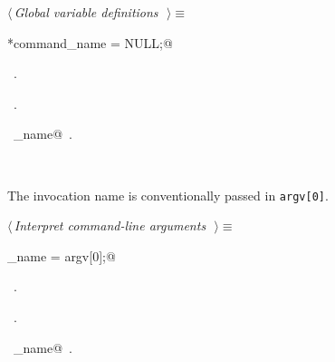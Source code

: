 \documentclass{report}
\begin{document}
\begin{flushleft} \small
\begin{minipage}{\linewidth} \label{scrap21}
$\langle\,${\it Global variable definitions}\nobreak\ {\footnotesize {}}$\,\rangle\equiv$
\vspace{-1ex}
\begin{list}{}{} \item
\mbox{}\verb@char *command_name = NULL;@\\
\mbox{}\verb@@{\NWsep}
\end{list}
\vspace{-1ex}
\footnotesize\addtolength{\baselineskip}{-1ex}
\begin{list}{}{\setlength{\itemsep}{-\parsep}\setlength{\itemindent}{-\leftmargin}}
\item \NWtxtMacroDefBy\ .
\item \NWtxtMacroRefIn\ .
\end{list}
\vspace{-2ex}
\footnotesize\addtolength{\baselineskip}{-1ex}
\begin{list}{}{\setlength{\itemsep}{-\parsep}\setlength{\itemindent}{-\leftmargin}}
\item \NWtxtIdentsUsed\nobreak\  \verb@command_name@\nobreak\ .\end{list}
\end{minipage}\\[4ex]
\end{flushleft}
The invocation name is conventionally passed in \verb|argv[0]|.
\begin{flushleft} \small
\begin{minipage}{\linewidth} \label{scrap22}
$\langle\,${\it Interpret command-line arguments}\nobreak\ {\footnotesize {}}$\,\rangle\equiv$
\vspace{-1ex}
\begin{list}{}{} \item
\mbox{}\verb@command_name = argv[0];@\\
\mbox{}\verb@@{\NWsep}
\end{list}
\vspace{-1ex}
\footnotesize\addtolength{\baselineskip}{-1ex}
\begin{list}{}{\setlength{\itemsep}{-\parsep}\setlength{\itemindent}{-\leftmargin}}
\item \NWtxtMacroDefBy\ .
\item \NWtxtMacroRefIn\ .
\end{list}
\vspace{-2ex}
\footnotesize\addtolength{\baselineskip}{-1ex}
\begin{list}{}{\setlength{\itemsep}{-\parsep}\setlength{\itemindent}{-\leftmargin}}
\item \NWtxtIdentsUsed\nobreak\  \verb@command_name@\nobreak\ .\end{list}
\end{minipage}\\[4ex]
\end{flushleft}
\end{document}
